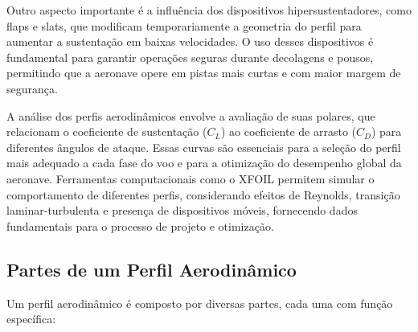 Outro aspecto importante é a influência dos dispositivos hipersustentadores, como flaps e slats, que modificam temporariamente a geometria do perfil para aumentar a sustentação em baixas velocidades. O uso desses dispositivos é fundamental para garantir operações seguras durante decolagens e pousos, permitindo que a aeronave opere em pistas mais curtas e com maior margem de segurança.

A análise dos perfis aerodinâmicos envolve a avaliação de suas polares, que relacionam o coeficiente de sustentação (\(C_L\)) ao coeficiente de arrasto (\(C_D\)) para diferentes ângulos de ataque. Essas curvas são essenciais para a seleção do perfil mais adequado a cada fase do voo e para a otimização do desempenho global da aeronave. Ferramentas computacionais como o XFOIL permitem simular o comportamento de diferentes perfis, considerando efeitos de Reynolds, transição laminar-turbulenta e presença de dispositivos móveis, fornecendo dados fundamentais para o processo de projeto e otimização.

\subsection{Partes de um Perfil Aerodinâmico}
Um perfil aerodinâmico é composto por diversas partes, cada uma com função específica:

